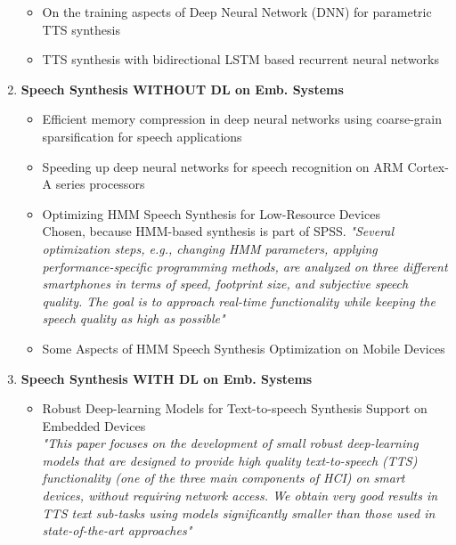 \begin{enumerate}[leftmargin=16pt]
\begin{itemize}[leftmargin=10pt]
		\item \textcolor{black!40}{On the training aspects of Deep Neural Network (DNN) for parametric TTS synthesis \cite{qian:training}}
		\item \textcolor{black!40}{TTS synthesis with bidirectional LSTM based recurrent neural networks \cite{fan:tts}}
	\end{itemize}
	\vspace{1em}
	\item \textbf{Speech Synthesis WITHOUT DL on Emb. Systems}
	\begin{itemize}[leftmargin=10pt]
		\item \textcolor{black!40}{Efficient memory compression in deep neural networks using coarse-grain sparsification for speech applications \cite{kadetotad:efficient}}
		\item \textcolor{black!40}{Speeding up deep neural networks for speech recognition on ARM Cortex-A series processors \cite{xing:speeding}}
		\item \textcolor{ACMRed}{Optimizing HMM Speech Synthesis for Low-Resource Devices} \cite{toth:optimizing}\\
		Chosen, because \ac{HMM}-based synthesis is part of \ac{SPSS}. \textit{"Several optimization steps, e.g., changing HMM parameters, applying performance-specific programming methods, are analyzed on three different smartphones in terms of speed, footprint size, and	subjective speech quality. The goal is to approach real-time functionality while keeping the speech quality as high as possible"}
		\item \textcolor{black!40}{Some Aspects of HMM Speech Synthesis Optimization on Mobile Devices \cite{toth:aspects}}
	\end{itemize}
	\vspace{1em}
	\item \textbf{Speech Synthesis WITH DL on Emb. Systems}
	\begin{itemize}[leftmargin=10pt]
		\item \textcolor{ACMRed}{Robust Deep-learning Models for Text-to-speech Synthesis Support on Embedded Devices} \cite{boros:robust} \\ \textit{"This paper focuses on the development of small robust deep-learning models that are designed to provide high quality text-to-speech (TTS) functionality (one of the three main components of HCI) on smart devices, without requiring network access. We obtain very good results in TTS text sub-tasks using models significantly smaller than those used in state-of-the-art approaches"}
	\end{itemize}
\end{enumerate}

